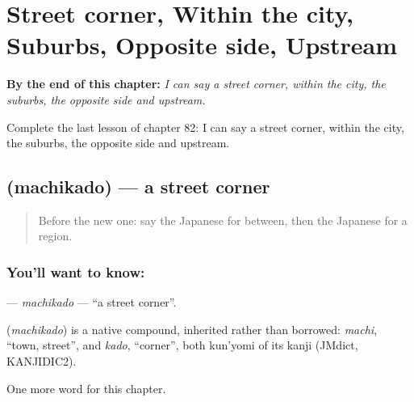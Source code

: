 
\chapter{Street corner, Within the city, Suburbs, Opposite side, Upstream}
\label{ch:ja-street-corner-within-the-city-suburbs-opposite-side-upstream}

\begin{chapteropening}
\textbf{By the end of this chapter:} \emph{I can say a street corner, within the city, the suburbs, the opposite side and upstream.}

Complete the last lesson of chapter 82: I can say a street corner, within the city, the suburbs, the opposite side and upstream.
\end{chapteropening}

\section[\texorpdfstring{\ja{まちかど} (machikado)}{まちかど (machikado)}]{ (machikado) — a street corner}

\label{lesson:JA-C82-machikado}



\begin{quote}
Before the new one: say the Japanese for between, then the Japanese for a region.
\end{quote}

\subsection*{You'll want to know: }
\textbf{} — \emph{machikado} — \textquotedblleft{}a street corner\textquotedblright{}.

\begin{cousinweb}
\textbf{} (\emph{machikado}) is a native compound, inherited rather than borrowed: \emph{machi}, \textquotedblleft{}town, street\textquotedblright{}, and \emph{kado}, \textquotedblleft{}corner\textquotedblright{}, both kun'yomi of its kanji (JMdict, KANJIDIC2).
\end{cousinweb}

\begin{grammarlens}[title={What you've built}]
One more word for this chapter.
\end{grammarlens}

